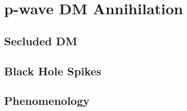 \chapter{p-wave DM Annihilation}
\section{Secluded DM}
\section{Black Hole Spikes}
\section{Phenomenology}